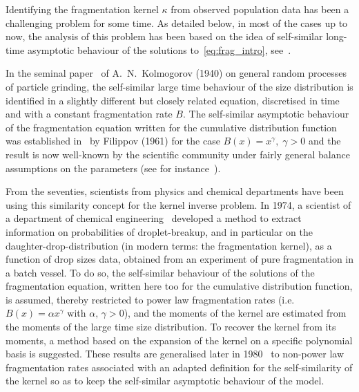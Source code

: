 \documentclass[10pt]{amsart}
\theoremstyle{definition}\newtheorem{defi}[theo]{Definition}\newtheorem{rema}[theo]{Remark}\newtheorem{exam}[theo]{Example}\newtheorem{exem}[theo]{Example}\newtheorem{nota}[theo]{Notation}
\begin{document}
Identifying the fragmentation kernel $\kappa$ from observed population data has been a challenging problem for some time. As detailed below, in most of the cases up to now, the analysis of this problem has been based on the idea of self-similar long-time asymptotic behaviour of the solutions to~\eqref{eq:frag_intro}, see~\cite{BCG13,Bertoin1,BW,CCGU,DubovskiStewart}.

In the seminal paper~\cite{Kolmogorov40} of A.~N.~Kolmogorov (1940) on general random processes of particle grinding, the self-similar large time behaviour of the size distribution is identified in a slightly different but closely related equation, discretised in time and with a constant fragmentation rate $B$. The self-similar asymptotic behaviour of the fragmentation equation written for the cumulative distribution function was established in~\cite{Filippov61} by Filippov (1961) for the case $B(x)=x^{\gamma},\;\gamma>0$ and the result is now well-known by the scientific community under fairly general balance assumptions on the parameters (see for instance~\cite{BCG13,CCM,EMR05,PerthameRyzhik}).


From the seventies, scientists from physics and chemical departments have been using this similarity concept for the kernel inverse problem. In 1974, a scientist of a department of chemical engineering~\cite{Ram74} developed a method to extract information on probabilities of droplet-breakup, and in particular on the daughter-drop-distribution (in modern terms: the fragmentation kernel), as a function of drop sizes data, obtained from an experiment of pure fragmentation in a batch vessel. To do so, the self-similar behaviour of the solutions of the fragmentation equation, written here too for the cumulative distribution function, is assumed, thereby restricted to power law fragmentation rates (i.e. $B(x)=\alpha x^\gamma$ with $\alpha,\,\gamma>0$), and the moments of the kernel are estimated from the moments of the large time size distribution. To recover the kernel from its moments, a method based on the expansion of the kernel on a specific polynomial basis is suggested. These results are generalised later in 1980~\cite{NRamG80} to non-power law fragmentation rates associated with an adapted definition for the self-similarity of the kernel so as to keep the self-similar asymptotic behaviour of the model.
\end{document}
